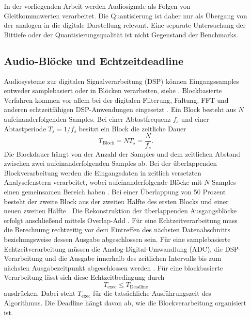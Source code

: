 In der vorliegenden Arbeit werden Audiosignale als Folgen von Gleitkommawerten verarbeitet. Die Quantisierung ist daher nur als Übergang von der analogen in die digitale Darstellung relevant. Eine separate Untersuchung der Bittiefe oder der Quantisierungsqualität ist nicht Gegenstand der Benchmarks.
\subsection{Audio-Blöcke und Echtzeitdeadline}
Audiosysteme zur digitalen Signalverarbeitung (DSP) können Eingangssamples entweder samplebasiert oder in Blöcken verarbeiten, siehe \parencite[S.~727]{tan2018digital}. Blockbasierte Verfahren kommen vor allem bei der digitalen Filterung, Faltung, FFT und anderen echtzeitfähigen DSP-Anwendungen eingesetzt \parencite[S.~727]{tan2018digital}.
Ein Block besteht aus $N$ aufeinanderfolgenden Samples. Bei einer Abtastfrequenz $f_s$ und einer Abtastperiode $T_s = 1/f_s$ besitzt ein Block die zeitliche Dauer
\begin{equation}
	T_{\mathrm{Block}} = N T_s = \frac{N}{f_s}.
\end{equation}
\noindent Die Blockdauer hängt von der Anzahl der Samples und dem zeitlichen Abstand zwischen zwei aufeinanderfolgenden Samples ab.
Bei der überlappenden Blockverarbeitung werden die Eingangsdaten in zeitlich versetzten Analysefenstern verarbeitet, wobei aufeinanderfolgende Blöcke mit $N$ Samples einen gemeinsamen Bereich haben \parencite[S.~499]{tan2018digital}. Bei einer Überlappung von 50 Prozent besteht der zweite Block aus der zweiten Hälfte des ersten Blocks und einer neuen zweiten Hälfte \parencite[S.~499]{tan2018digital}. Die Rekonstruktion der überlappenden Ausgangsblöcke erfolgt anschließend mittels Overlap-Add \parencite[S.~500]{tan2018digital}.
Für eine Echtzeitverarbeitung muss die Berechnung rechtzeitig vor dem Eintreffen des nächsten Datenabschnitts beziehungsweise dessen Ausgabe abgeschlossen sein. Für eine samplebasierte Echtzeitverarbeitung müssen die Analog-Digital-Umwandlung (ADC), die DSP-Verarbeitung und die Ausgabe innerhalb des zeitlichen Intervalls bis zum nächsten Ausgabezeitpunkt abgeschlossen werden \parencite[S.~761]{tan2018digital}.
Für eine blockbasierte Verarbeitung lässt sich diese Echtzeitbedingung durch
\begin{equation}
	T_{\mathrm{exec}} \leq T_{\mathrm{Deadline}}
\end{equation}
\noindent ausdrücken. Dabei steht $T_{\mathrm{exec}}$ für die tatsächliche Ausführungszeit des Algorithmus. Die Deadline hängt davon ab, wie die Blockverarbeitung organisiert ist.

